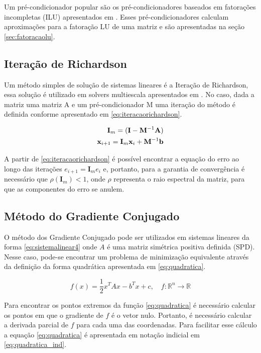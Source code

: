 Um pré-condicionador popular são os pré-condicionadores baseados em fatorações incompletas (ILU) apresentados em \citet{ilupaper}. Esses pré-condicionadores calculam aproximações para a fatoração LU de uma matriz e são apresentadas na seção \ref{sec:fatoracaolu}.

\subsection{Iteração de Richardson}

Um método simples de solução de sistemas lineares é a Iteração de Richardson, essa solução é utilizado em solvers multiescala apresentados em \citet{msparalelo}. No caso, dada a matriz uma matriz A e um pré-condicionador M uma iteração do método é definida conforme apresentado em \eqref{eq:iteracaorichardson}.

\begin{align} \label{eq:iteracaorichardson}
\mathbf{I}_m = (\mathbf{I} - \mathbf{M}^{-1} \mathbf{A})    \\
\mathbf{x}_{i+1} = \mathbf{I}_m  \mathbf{x}_i + \mathbf{M}^{-1} \mathbf{b}  
\end{align}

A partir de \eqref{eq:iteracaorichardson} é possível encontrar a equação do erro ao longo das iterações $e_{i+1} = \mathbf{I}_m e_i$ e, portanto, para a garantia de convergência é necessário que 
$\rho(\mathbf{I}_m) < 1$, onde $\rho$ representa o raio espectral da matriz, para que as componentes do erro se anulem.




\subsection{Método do Gradiente Conjugado}

O método dos Gradiente Conjugado pode ser utilizados em sistemas lineares da forma \eqref{eq:sistemalinear4} onde $A$ é uma matriz simétrica positiva definida (SPD). Nesse caso, pode-se encontrar um problema de minimização equivalente através da definição da forma quadrática apresentada em \eqref{eq:quadratica}. 

\begin{equation} \label{eq:quadratica}
    f(x) = \frac{1}{2}  x^T A x - b^T x + c, \quad f:\mathbb{R}^n \rightarrow \mathbb{R}
\end{equation}

Para encontrar os pontos extremos da função \eqref{eq:quadratica} é necessário calcular os pontos em que o gradiente de $f$ é o vetor nulo. Portanto, é necessário calcular a derivada parcial de $f$ para cada uma das coordenadas. Para facilitar esse cálculo a equação \ref{eq:quadratica} é apresentada em notação indicial em \eqref{eq:quadratica_ind}.


